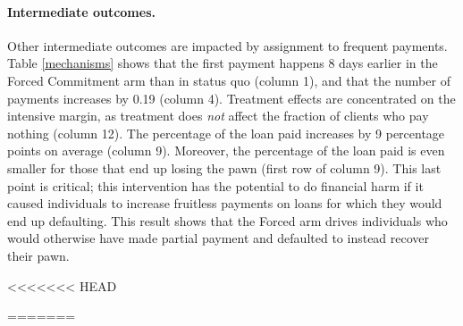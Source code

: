 \documentclass[oneside,11pt]{article}
\begin{document}
\paragraph{Intermediate outcomes.} Other intermediate outcomes are impacted by assignment to frequent payments. Table \ref{mechanisms} shows that the first payment happens 8 days earlier in the Forced Commitment arm than in status quo (column 1), and that the number of payments increases by 0.19 (column 4). Treatment effects are concentrated on the intensive margin, as treatment does \textit{not} affect the fraction of clients who pay nothing (column 12). The percentage of the loan paid increases by 9 percentage points on average (column 9). Moreover, the percentage of the loan paid is even smaller for those that end up losing the pawn (first row of column 9). This last point is critical; this intervention has the potential to do financial harm if it caused individuals to increase fruitless payments on loans for which they would end up defaulting.  This result shows that the Forced arm drives individuals who would otherwise have made partial payment and defaulted to instead recover their pawn.



<<<<<<< HEAD

=======
\end{document}
